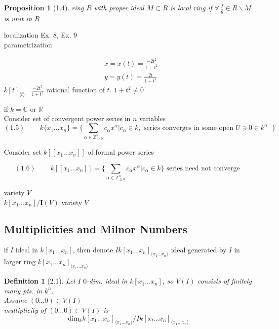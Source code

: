 \documentclass[10pt]{amsart}
\newtheorem{proposition}{Proposition}
\newtheorem{definition}{Definition}
\newcommand{\exercisehead}[1]
  { \smallskip
   \noindent{\small\bf Exercise #1.}
  }
\begin{document}
\begin{multicols*}{2}
\begin{proposition}[1.4] ring $R$ with proper ideal $M\subset R$ is local ring if $\forall \, \frac{f}{g} \in R\backslash M$ is unit in $R$
\end{proposition}

localization Ex. 8, Ex. 9 \\
parametrization

\exercisehead{2} \[
\begin{aligned}
  & x = x(t) = \frac{-2t^2 }{1+t^2} \\ 
 &  y = y(t) = \frac{2t}{1+t^2}
\end{aligned}
\]
$k[t]_{\langle t \rangle}$ \quad \, $\frac{-2t^2}{1+t^2}$ rational function of $t$.  $1+t^2 \neq 0$

if $k = \mathbb{C}$ or $\mathbb{R}$ \\

Consider set of convergent power series in $n$ variables \\

\begin{equation}
(1.5) \quad \quad \,   k\lbrace x_1 \dots x_n \rbrace = \lbrace \sum_{\alpha \in \mathbb{Z}^n_{\geq 0}} c_{\alpha} x^{\alpha} | c_{\alpha} \in k, \text{ series converges in some open $U\ni 0 \in k^n $ } \rbrace
\end{equation}

Consider set $k[[x_1 \dots x_n]]$ of formal power series

\begin{equation}
  (1.6) \quad \quad \, k[[x_1 \dots x_n]] = \lbrace \sum_{\alpha \in \mathbb{Z}^n_{\geq 0}} c_{\alpha} x^{\alpha} | c_{\alpha} \in k \rbrace \text{ series need not converge }
\end{equation} 


variety $V$ \\

$k[x_1\dots x_n]/\mathbf{I}(V)$ \phantom{ \quad \quad \quad } variety $V$


\subsection{Multiplicities and Milnor Numbers}


if $I$ ideal in $k[x_1\dots x_n]$, then denote $Ik[x_1\dots x_n]_{\langle x_1 \dots x_n \rangle}$ ideal generated by $I$ in larger ring $k[x_1\dots x_n]_{\langle x_1 \dots x_n \rangle}$

\begin{definition}[2.1] Let $I$ $0$-dim. ideal in $k[x_1 \dots x_n]$, so $V(I)$ consists of finitely many pts. in $k^n$.  \\
Assume $(0 \dots 0) \in V(I)$ \\
multiplicity of $(0\dots 0)\in V(I)$ is 
\[
\text{dim}_k{ k[x_1\dots x_n]_{\langle x_1\dots x_n \rangle}} / Ik[x_!\dots x_n]_{\langle x_1 \dots x_n \rangle}
\]
\end{definition}



\end{multicols*}
\end{document}
